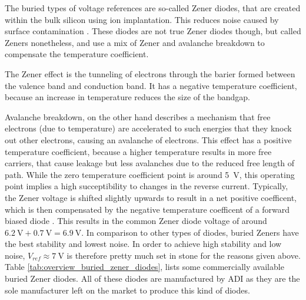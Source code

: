 The buried types of voltage references are so-called Zener diodes, that are created within the bulk silicon using ion implantation. This reduces noise caused by surface contamination \cite{zener_diode_stability}. These diodes are not true Zener diodes though, but called Zeners nonetheless, and use a mix of Zener and avalanche breakdown to compensate the temperature coefficient.

The Zener effect is the tunneling of electrons through the barier formed between the valence band and conduction band. It has a negative temperature coefficient, because an increase in temperature reduces the size of the bandgap.

Avalanche breakdown, on the other hand describes a mechanism that free electrons (due to temperature) are accelerated to such energies that they knock out other electrons, causing an avalanche of electrons. This effect has a positive temperature coefficient, because a higher temperature results in more free carriers, that cause leakage but less avalanches due to the reduced free length of path. While the zero temperature coefficient point is around \qty{5}{\V}, this operating point implies a high succeptibility to changes in the reverse current. Typically, the Zener voltage is shifted slightly upwards to result in a net positive coefficent, which is then compensated by the negative temperature coefficent of a forward biased diode \cite{zener_diode_stability}. This results in the common Zener diode voltage of around $\qty{6.2}{\V} + \qty{0.7}{\V} = \qty{6.9}{\V}$. In comparison to other types of diodes, buried Zeners have the best stability and lowest noise. In order to achieve high stability and low noise, $V_{ref} \approx \qty{7}{\V}$ is therefore pretty much set in stone for the reasons given above. Table \ref{tab:overview_buried_zener_diodes}, lists some commercially available buried Zener diodes. All of these diodes are manufactured by ADI as they are the sole manufacturer left on the market to produce this kind of diodes.

